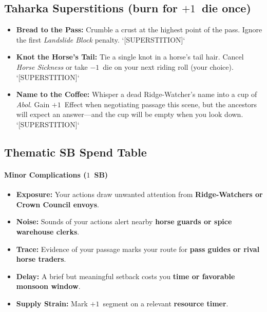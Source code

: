 \subsection{Taharka Superstitions (burn for $+1$~die once)}
\begin{itemize}
  \item \textbf{Bread to the Pass:} Crumble a crust at the highest point of the pass. Ignore the first \emph{Landslide Block} penalty. `[SUPERSTITION]`
  \item \textbf{Knot the Horse's Tail:} Tie a single knot in a horse's tail hair. Cancel \emph{Horse Sickness} or take $-1$~die on your next riding roll (your choice). `[SUPERSTITION]`
  \item \textbf{Name to the Coffee:} Whisper a dead Ridge-Watcher's name into a cup of \textit{Abol}. Gain $+1$~Effect when negotiating passage this scene, but the ancestors will expect an answer---and the cup will be empty when you look down. `[SUPERSTITION]`
\end{itemize}

\subsection{Thematic SB Spend Table}
\label{sec:taharka-sb}

\paragraph{Minor Complications ($1$~SB)}
\begin{itemize}
\item \textbf{Exposure:} Your actions draw unwanted attention from \textbf{Ridge-Watchers or Crown Council envoys}.
\item \textbf{Noise:} Sounds of your actions alert nearby \textbf{horse guards or spice warehouse clerks}.
\item \textbf{Trace:} Evidence of your passage marks your route for \textbf{pass guides or rival horse traders}.
\item \textbf{Delay:} A brief but meaningful setback costs you \textbf{time or favorable monsoon window}.
\item \textbf{Supply Strain:} Mark $+1$~segment on a relevant \textbf{resource timer}.
\end{itemize}

